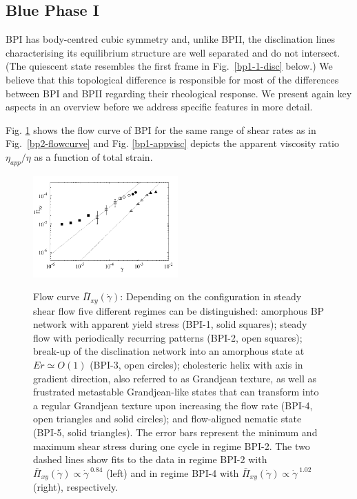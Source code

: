\documentclass[8.5pt,twoside,twocolumn]{article}
\newcommand{\gd}{\dot{\gamma}}
\begin{document}
\subsection{Blue Phase I}

BPI has body-centred cubic symmetry and, unlike BPII, the disclination lines
characterising its equilibrium structure are well separated and do not 
intersect. (The quiescent state resembles the first frame in Fig.~\ref{bp1-1-disc}
below.)
We believe that this topological difference is responsible for most of
the differences between BPI and BPII regarding their rheological response. 
We present again key aspects in an overview before we address specific features 
in more detail. 

Fig. \ref{bp1-flowcurve} shows the flow curve of BPI for the same range of
shear rates as in Fig.~\ref{bp2-flowcurve} and Fig. \ref{bp1-appvisc} depicts 
the apparent viscosity ratio $\eta_{app}/\eta$ as a function of total strain.

\begin{figure}[htpb]
\includegraphics[width=0.495\textwidth]{flowcurve_bp1.pdf}\\
\caption{
Flow curve $\bar{\Pi}_{xy}(\gd)$: 
Depending on the configuration in steady shear flow five different regimes 
can be distinguished: amorphous BP network with apparent yield stress (BPI-1, solid squares); 
steady flow with periodically recurring patterns (BPI-2, open squares); 
break-up of the disclination network into an amorphous state at $Er\simeq O(1)$ (BPI-3, open circles);
cholesteric helix with axis in gradient direction, also referred to
as Grandjean texture, as well as frustrated metastable Grandjean-like states that can transform into 
a regular Grandjean texture upon increasing the flow rate (BPI-4, open triangles and solid circles);
and flow-aligned nematic state (BPI-5, solid triangles). 
The error bars represent the minimum and maximum shear stress 
during one cycle in regime BPI-2.
The two dashed lines show fits to the data in regime BPI-2 with 
$\bar{\Pi}_{xy}(\gd)\propto \gd^{\;0.84}$ (left) 
and in regime BPI-4 with 
$\bar{\Pi}_{xy}(\gd)\propto \gd^{\;1.02}$ (right), respectively.}
\label{bp1-flowcurve}
\end{figure}
\end{document}

